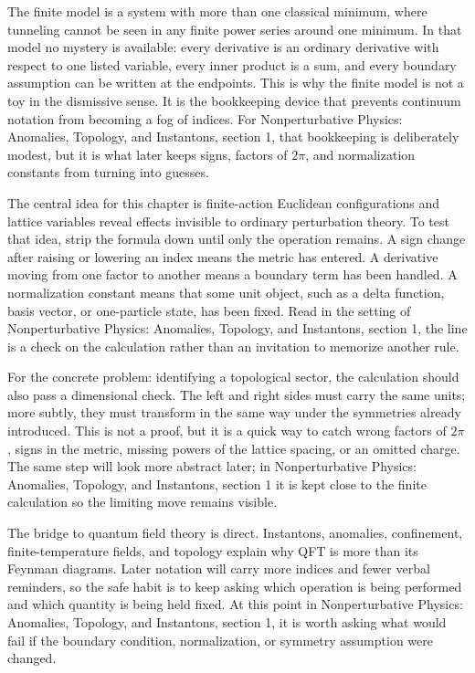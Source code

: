 The finite model is a system with more than one classical minimum, where tunneling cannot be seen in any finite power series around one minimum.  In that model no mystery is available: every derivative is an ordinary derivative with respect to one listed variable, every inner product is a sum, and every boundary assumption can be written at the endpoints.  This is why the finite model is not a toy in the dismissive sense.  It is the bookkeeping device that prevents continuum notation from becoming a fog of indices.  For Nonperturbative Physics: Anomalies, Topology, and Instantons, section 1, that bookkeeping is deliberately modest, but it is what later keeps signs, factors of \(2\pi\), and normalization constants from turning into guesses.

The central idea for this chapter is finite-action Euclidean configurations and lattice variables reveal effects invisible to ordinary perturbation theory.  To test that idea, strip the formula down until only the operation remains.  A sign change after raising or lowering an index means the metric has entered.  A derivative moving from one factor to another means a boundary term has been handled.  A normalization constant means that some unit object, such as a delta function, basis vector, or one-particle state, has been fixed.  Read in the setting of Nonperturbative Physics: Anomalies, Topology, and Instantons, section 1, the line is a check on the calculation rather than an invitation to memorize another rule.

For the concrete problem: identifying a topological sector, the calculation should also pass a dimensional check.  The left and right sides must carry the same units; more subtly, they must transform in the same way under the symmetries already introduced.  This is not a proof, but it is a quick way to catch wrong factors of \(2\pi\), signs in the metric, missing powers of the lattice spacing, or an omitted charge.  The same step will look more abstract later; in Nonperturbative Physics: Anomalies, Topology, and Instantons, section 1 it is kept close to the finite calculation so the limiting move remains visible.

The bridge to quantum field theory is direct.  Instantons, anomalies, confinement, finite-temperature fields, and topology explain why QFT is more than its Feynman diagrams.  Later notation will carry more indices and fewer verbal reminders, so the safe habit is to keep asking which operation is being performed and which quantity is being held fixed.  At this point in Nonperturbative Physics: Anomalies, Topology, and Instantons, section 1, it is worth asking what would fail if the boundary condition, normalization, or symmetry assumption were changed.

